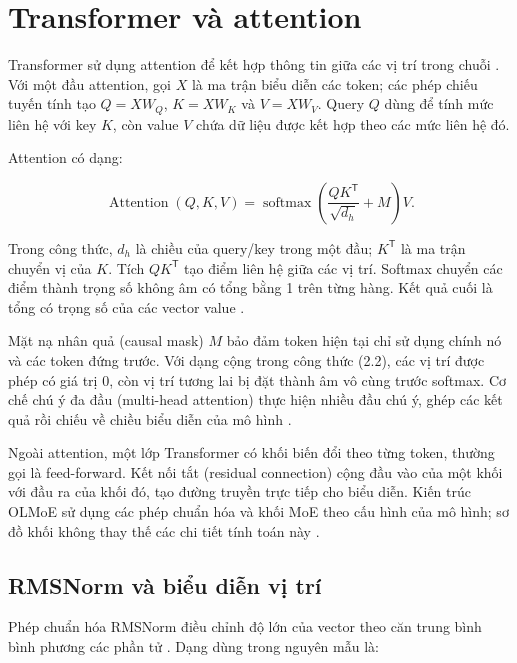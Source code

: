 \section{Transformer và attention}

Transformer sử dụng attention để kết hợp thông tin giữa các vị trí trong chuỗi \cite{vaswani_attention}. Với một đầu attention, gọi $X$ là ma trận biểu diễn các token; các phép chiếu tuyến tính tạo $Q=XW_Q$, $K=XW_K$ và $V=XW_V$. Query $Q$ dùng để tính mức liên hệ với key $K$, còn value $V$ chứa dữ liệu được kết hợp theo các mức liên hệ đó.

Attention có dạng:

\begin{equation}
\label{eq:2.2}
\operatorname{Attention}(Q,K,V)=\operatorname{softmax}\left(\frac{QK^\mathsf{T}}{\sqrt{d_h}}+M\right)V.
\end{equation}

Trong công thức, $d_h$ là chiều của query/key trong một đầu; $K^\mathsf{T}$ là ma trận chuyển vị của $K$. Tích $QK^\mathsf{T}$ tạo điểm liên hệ giữa các vị trí. Softmax chuyển các điểm thành trọng số không âm có tổng bằng 1 trên từng hàng. Kết quả cuối là tổng có trọng số của các vector value \cite[mục 3.2.1]{vaswani_attention}.

Mặt nạ nhân quả (causal mask) $M$ bảo đảm token hiện tại chỉ sử dụng chính nó và các token đứng trước. Với dạng cộng trong công thức (2.2), các vị trí được phép có giá trị 0, còn vị trí tương lai bị đặt thành âm vô cùng trước softmax. Cơ chế chú ý đa đầu (multi-head attention) thực hiện nhiều đầu chú ý, ghép các kết quả rồi chiếu về chiều biểu diễn của mô hình \cite[mục 3.2.2]{vaswani_attention}.

Ngoài attention, một lớp Transformer có khối biến đổi theo từng token, thường gọi là feed-forward. Kết nối tắt (residual connection) cộng đầu vào của một khối với đầu ra của khối đó, tạo đường truyền trực tiếp cho biểu diễn. Kiến trúc OLMoE sử dụng các phép chuẩn hóa và khối MoE theo cấu hình của mô hình; sơ đồ khối không thay thế các chi tiết tính toán này \cite{olmoe}.

\subsection{RMSNorm và biểu diễn vị trí}

Phép chuẩn hóa RMSNorm điều chỉnh độ lớn của vector theo căn trung bình bình phương các phần tử \cite{rmsnorm}. Dạng dùng trong nguyên mẫu là:

